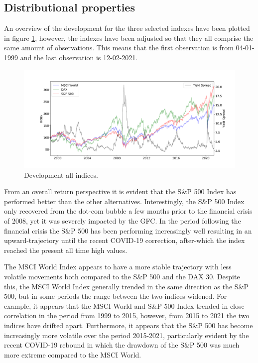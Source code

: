 \subsection{Distributional properties}
An overview of the development for the three selected indexes have been plotted in figure \ref{fig: all_indices_index}, however, the indexes have been adjusted so that they all comprise the same amount of observations. This means that the first observation is from 04-01-1999 and the last observation is 12-02-2021. 
\begin{figure}[H] 
    \centering
    \includegraphics[width=1.0\textwidth]{analysis/data_description/images/comb_index.png}
    \caption{Development all indices.}
    \label{fig: all_indices_index}
\end{figure}

From an overall return perspective it is evident that the S\&P 500 Index has performed better than the other alternatives. Interestingly, the S\&P 500 Index only recovered from the dot-com bubble a few months prior to the financial crisis of 2008, yet it was severely impacted by the GFC. In the period following the financial crisis the S\&P 500 has been performing increasingly well resulting in an upward-trajectory until the recent COVID-19 correction, after-which the index reached the present all time high values. 

The MSCI World Index appears to have a more stable trajectory with less volatile movements both compared to the S\&P 500 and the DAX 30. Despite this, the MSCI World Index generally trended in the same direction as the S\&P 500,
but in some periods the range between the two indices widened. For example,
it appears that the MSCI World and S\&P 500 Index trended in close correlation in the period from 1999 to 2015, however, from 2015 to 2021 the two indices have drifted apart. Furthermore, it appears that the S\&P 500 has become increasingly more volatile over the period 2015-2021, particularly evident by the recent COVID-19 rebound in which the drawdown of the S\&P 500 was much more extreme compared to the MSCI World.  

